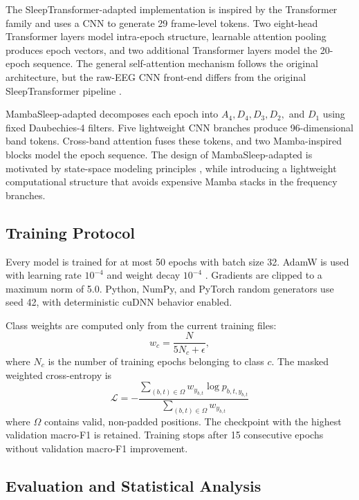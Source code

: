 \documentclass[conference]{IEEEtran}
\begin{document}
The SleepTransformer-adapted implementation is inspired by the Transformer family \cite{vaswani2017attention,phan2022sleeptransformer} and uses a CNN to generate 29 frame-level tokens. Two eight-head Transformer layers model intra-epoch structure, learnable attention pooling produces epoch vectors, and two additional Transformer layers model the 20-epoch sequence. The general self-attention mechanism follows the original architecture, but the raw-EEG CNN front-end differs from the original SleepTransformer pipeline \cite{phan2022sleeptransformer}.

MambaSleep-adapted decomposes each epoch into $A_4,D_4,D_3,D_2,$ and $D_1$ using fixed Daubechies-4 filters. Five lightweight CNN branches produce 96-dimensional band tokens. Cross-band attention fuses these tokens, and two Mamba-inspired blocks model the epoch sequence. The design of MambaSleep-adapted is motivated by state-space modeling principles \cite{gu2023mamba}, while introducing a lightweight computational structure that avoids expensive Mamba stacks in the frequency branches.

\subsection{Training Protocol}

Every model is trained for at most 50 epochs with batch size 32. AdamW is used with learning rate $10^{-4}$ and weight decay $10^{-4}$ \cite{loshchilov2017adamw}. Gradients are clipped to a maximum norm of 5.0. Python, NumPy, and PyTorch random generators use seed 42, with deterministic cuDNN behavior enabled.

Class weights are computed only from the current training files:
\begin{equation}
w_c=\frac{N}{5N_c+\epsilon},
\end{equation}
where $N_c$ is the number of training epochs belonging to class $c$. The masked weighted cross-entropy is
\begin{equation}
\mathcal{L}=
-\frac{\sum_{(b,t)\in\Omega} w_{y_{b,t}}\log p_{b,t,y_{b,t}}}
      {\sum_{(b,t)\in\Omega} w_{y_{b,t}}}
\end{equation}
where $\Omega$ contains valid, non-padded positions. The checkpoint with the highest validation macro-F1 is retained. Training stops after 15 consecutive epochs without validation macro-F1 improvement.

\subsection{Evaluation and Statistical Analysis}
\end{document}
